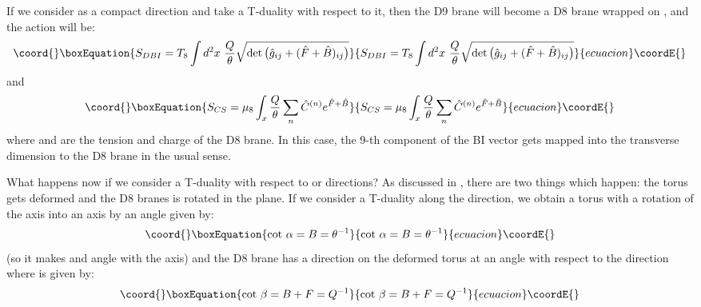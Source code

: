 \documentclass[a4paper,12pt]{article}
\begin{document}
If we consider \coordHE{} as a compact direction and take a T-duality with respect
to it, then the D9 brane will become a D8 brane wrapped on  \coordHE{},
and the action will be:
\begin{equation}\coord{}\boxEquation{
\label{dbi3}
S_{DBI} =  T_8 \int d^{2} x~ {Q \over \theta} 
\sqrt{\det\big(\hat{g}_{ij} + (\hat{F} + \hat{B})_{ij}\big)}
}{
S_{DBI} =  T_8 \int d^{2} x~ {Q \over \theta} 
\sqrt{\det\big(\hat{g}_{ij} + (\hat{F} + \hat{B})_{ij}\big)}
}{ecuacion}\coordE{}\end{equation}
and 
\begin{equation}\coord{}\boxEquation{
\label{cs3}
S_{CS} = \mu_8 \int_x {Q \over \theta}
\sum_n \hat{C}^{(n)} e^{\hat{F} + \hat{B}}
}{
S_{CS} = \mu_8 \int_x {Q \over \theta}
\sum_n \hat{C}^{(n)} e^{\hat{F} + \hat{B}}
}{ecuacion}\coordE{}\end{equation}
where \coordHE{} and \coordHE{} are the tension and charge of the D8 brane.
In this case, the 9-th component of the BI vector \coordHE{} gets mapped 
into the 
transverse dimension \coordHE{} to the D8 brane in the usual sense.

What happens now if we consider a T-duality with respect to \coordHE{} or \coordHE{}
directions? As discussed in 
\cite{chen,ima,blu1,blu2,blu3}, there are two things
which happen: the \coordHE{} torus gets deformed and the D8 branes is rotated in
the  \coordHE{} plane. If we consider a T-duality along the 
\coordHE{} direction, we obtain a torus with a rotation of the \coordHE{} axis
into an \coordHE{} axis by an angle \coordHE{} given by:
\begin{equation}\coord{}\boxEquation{
\label{angles1}
\mbox{cot}~\alpha = B = \theta^{-1}
}{
\mbox{cot}~\alpha = B = \theta^{-1}
}{ecuacion}\coordE{}\end{equation}
(so it makes and angle \myHighlight{$\alpha$}\coordHE{} with the \coordHE{} axis) 
and the D8 brane has a direction on the deformed torus \coordHE{} 
at an angle \myHighlight{$\beta$}\coordHE{} with respect to the direction \coordHE{} where
\myHighlight{$\beta$}\coordHE{} is given by:
\begin{equation}\coord{}\boxEquation{
\label{angles2}
\mbox{cot}~\beta = B + F = Q^{-1}
}{
\mbox{cot}~\beta = B + F = Q^{-1}
}{ecuacion}\coordE{}\end{equation} 
\end{document}
